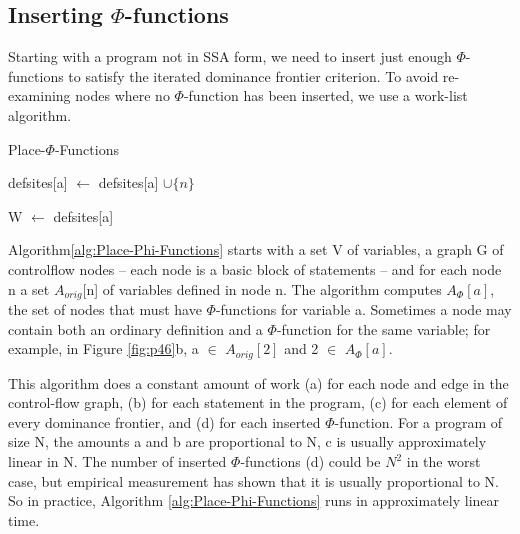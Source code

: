 \subsection{Inserting $\Phi$-functions}

Starting with a program not in SSA form, we need to insert just enough $\Phi$-functions to satisfy the iterated dominance frontier criterion. To avoid re-examining nodes where no $\Phi$-function has been inserted, we use a work-list algorithm.

\begin{algorithm}
	\caption{Place-$\Phi$-Functions}\label{alg:Place-Phi-Functions}
	\begin{algorithmic}
		\State defsites[a] $\gets$ defsites[a] $\cup \{n\}$
		\EndFor
		\EndFor


		\State W $\gets$ defsites[a]
		\EndIf

		\EndIf
		\EndFor
		\EndWhile
		\EndFor

	\end{algorithmic}
\end{algorithm}


Algorithm\ref{alg:Place-Phi-Functions} starts with a set V of variables, a graph G of controlflow nodes – each node is a basic block of statements – and for each node n a set $A_{orig}$[n] of variables defined in node n. The algorithm
computes $A_{\Phi}[a]$, the set of nodes that must have $\Phi$-functions for variable
a. Sometimes a node may contain both an ordinary definition and a
$\Phi$-function for the same variable; for example, in Figure \ref{fig:p46}b, a $\in$ $A_{orig}[2]$
and 2 $\in$ $A_{\Phi}[a]$.


This algorithm does a constant amount of work (a) for each node and edge in the control-flow graph, (b) for each statement in the program, (c) for each element of every dominance frontier, and (d) for each inserted $\Phi$-function. For a program of size N, the amounts a and b are proportional to N, c is usually approximately linear in N. The number of inserted $\Phi$-functions (d) could be $N^2$ in the worst case, but empirical measurement has shown that it is usually proportional to N. So in practice, Algorithm \ref{alg:Place-Phi-Functions} runs in approximately linear time.


